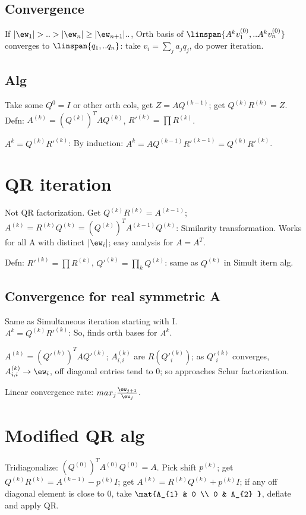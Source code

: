 \documentclass[oneside, article]{memoir}
\begin{document}
\subsection{Convergence}
If $|\ew_{1}| > .. > |\ew_{n}| \geq |\ew_{n+1}|..$, Orth basis of $\linspan{A^{k}v_{1}^{(0)}, .. A^{k}v_{n}^{(0)}}$ converges to $\linspan{q_{1}, .. q_{n}}$: take $v_{i} = \sum_{j}a_{j}q_{j}$, do power iteration.

\subsection{Alg}
Take some $Q^{0} = I$ or other orth cols, get $Z = AQ^{(k-1)}$; get $Q^{(k)}R^{(k)} = Z$. Defn: $A^{(k)} = (Q^{(k)})^{T}AQ^{(k)}$, $R'^{(k)} = \prod R^{(k)}$.

$A^{k} = Q^{(k)}R'^{(k)}$: By induction: $A^{k} = AQ^{(k-1)}R'^{(k-1)} = Q^{(k)}R'^{(k)}$.

\section{QR iteration}
Not QR factorization. Get $Q^{(k)}R^{(k)} = A^{(k-1)}$;\\
 $A^{(k)}=R^{(k)}Q^{(k)} = (Q^{(k)})^{T}A^{(k-1)}Q^{(k)}$: Similarity transformation. Works for all A with distinct $|\ew_{i}|$; easy analysis for $A=A^{T}$.

Defn: $R'^{(k)} = \prod R^{(k)}$, $Q'^{(k)} = \prod_{k} Q^{(k)}$: same as $Q^{(k)}$ in Simult itern alg.


\subsection{Convergence for real symmetric A}
Same as Simultaneous iteration starting with I. \\
$A^{k} = Q^{(k)}R'^{(k)}$: So, finds orth bases for $A^{k}$.

$A^{(k)} = (Q'^{(k)})^{T}AQ'^{(k)}$; $A^{(k)}_{i,i}$ are $R(Q'^{(k)}_{i})$; as $Q'^{(k)}_{i}$ converges, $A^{(k)}_{i,i} \to \ew_{i}$, off diagonal entries tend to 0; so approaches Schur factorization.

Linear convergence rate: $max_{j}\frac{\ew_{j+1}}{\ew_{j}}$.

\section{Modified QR alg}
Tridiagonalize: $(Q^{(0)})^{T}A^{(0)}Q^{(0)} = A$. Pick shift $p^{(k)}$; get $Q^{(k)}R^{(k)}=A^{(k-1)} - p^{(k)}I$; get $A^{(k)} = R^{(k)}Q^{(k)} + p^{(k)}I$; if any off diagonal element is close to 0, take $\mat{A_{1} & 0 \\ 0 & A_{2} }$, deflate and apply QR.
\end{document}
